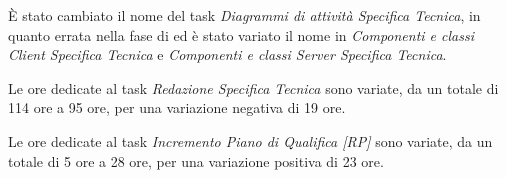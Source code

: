 È stato cambiato il nome del task \emph{Diagrammi di attività Specifica Tecnica}, in quanto errata nella fase di \PA{} ed è stato variato il nome in \emph{Componenti e classi Client Specifica Tecnica} e \emph{Componenti e classi Server Specifica Tecnica}.

Le ore dedicate al task \emph{Redazione Specifica Tecnica} sono variate, da un totale di 114 ore a 95 ore, per una variazione negativa di 19 ore.

Le ore dedicate al task \emph{Incremento Piano di Qualifica [RP]} sono variate, da un totale di 5 ore a 28 ore, per una variazione positiva di 23 ore.





\pagebreak
